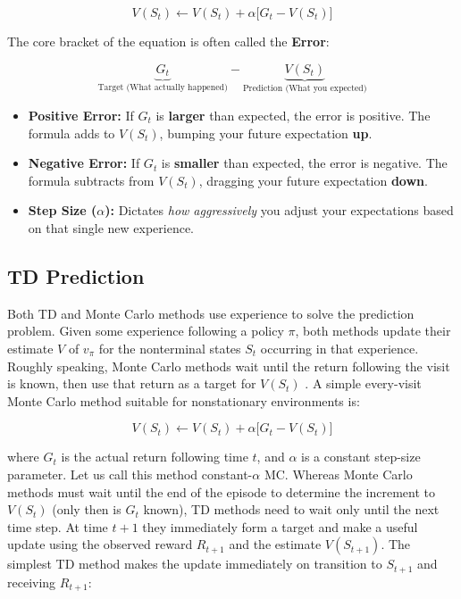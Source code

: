 \documentclass{article}
\begin{document}
\[
V(S_t) \leftarrow V(S_t) + \alpha \Big[ G_t - V(S_t) \Big]
\]

The core bracket of the equation is often called the \textbf{Error}:

\[
\underbrace{G_t}_{\text{Target (What actually happened)}} - \underbrace{V(S_t)}_{\text{Prediction (What you expected)}}
\]

\begin{itemize}
    \item \textbf{Positive Error:} If $G_t$ is \textbf{larger} than expected, the error is positive. The formula adds to $V(S_t)$, bumping your future expectation \textbf{up}.
    \item \textbf{Negative Error:} If $G_t$ is \textbf{smaller} than expected, the error is negative. The formula subtracts from $V(S_t)$, dragging your future expectation \textbf{down}.
    \item \textbf{Step Size ($\alpha$):} Dictates \emph{how aggressively} you adjust your expectations based on that single new experience.
\end{itemize}

\subsection{TD Prediction}

Both TD and Monte Carlo methods use experience to solve the prediction problem. Given some experience following a policy $\pi$, both methods update their estimate $V$ of $v _ { \pi }$ 
for the nonterminal states $S _ { t }$ occurring in that experience. Roughly speaking, Monte Carlo methods wait until the return following the visit is known, 
then use that return as a target for $V ( S _ { t } )$ . A simple every-visit Monte Carlo method suitable for nonstationary environments is:

$$
V ( S _ { t } ) \leftarrow V ( S _ { t } ) + \alpha \Big [ G _ { t } - V ( S _ { t } ) \Big ]
$$

where $G _ { t }$ is the actual return following time $t$, and $ \alpha $ is a constant step-size parameter. Let us call this method constant-$ \alpha $ MC.
Whereas Monte Carlo methods must wait until the end of the episode to determine the increment to $V ( S _ { t } )$ (only then is $G _ { t }$ known), TD methods need to wait only until the next time step.
At time $t + 1$ they immediately form a target and make a useful update using the observed reward $R _ { t + 1 }$ and the estimate $V ( S _ { t + 1 } )$. The simplest TD method makes the update 
immediately on transition to $S _ { t + 1 }$ and receiving $R _ { t + 1 }$:
\end{document}
